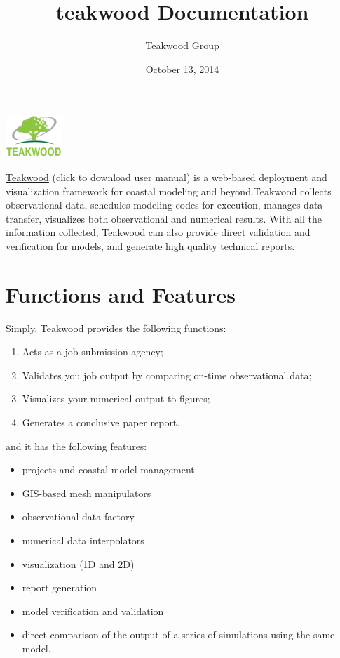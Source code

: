 \documentclass[letterpaper,10pt,openany, oneside]{sphinxmanual}
\title{teakwood Documentation}
\date{October 13, 2014}
\author{Teakwood Group}
\begin{document}
\maketitle
\tableofcontents
{}\label{index::doc}
\includegraphics{logo.png}



\href{http://localhost:8000}{Teakwood} (click   to download user manual) is a web-based
deployment and visualization framework for coastal modeling and beyond.Teakwood collects observational data,
schedules modeling codes for execution, manages data transfer, visualizes both observational and numerical results.
With all the information collected, Teakwood can also provide direct validation and verification for models,
and generate high quality technical reports.


\chapter{Functions and Features}
\label{feature:functions-and-features}\label{feature::doc}\label{feature:welcome-to-teakwood-s-documentation}
Simply, Teakwood provides the following functions:
\begin{enumerate}
\item {} 
Acts as a job submission agency;

\item {} 
Validates you job output by comparing on-time observational data;

\item {} 
Visualizes your numerical output to figures;

\item {} 
Generates a conclusive paper report.

\end{enumerate}

and it has the following features:
\begin{itemize}
\item {} 
projects and coastal model management

\item {} 
GIS-based mesh manipulators

\item {} 
observational data factory

\item {} 
numerical data interpolators

\item {} 
visualization (1D and 2D)

\item {} 
report generation

\item {} 
model verification and validation

\item {} 
direct comparison of the output of a series of simulations using the same model.

\end{itemize}
\end{document}
